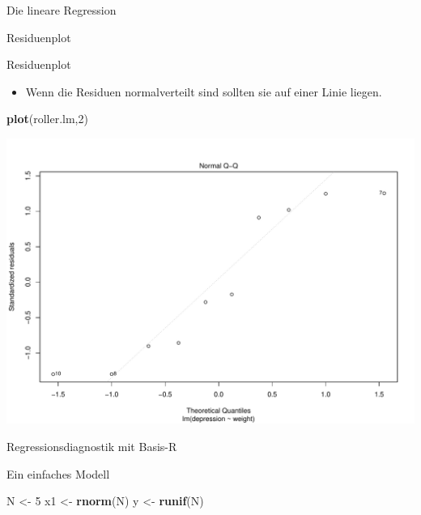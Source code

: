 \documentclass[ignorenonframetext,]{beamer}
\newenvironment{Shaded}{}{}
\newcommand{\KeywordTok}[1]{\textcolor[rgb]{0.00,0.44,0.13}{\textbf{{#1}}}}
\newcommand{\DecValTok}[1]{\textcolor[rgb]{0.25,0.63,0.44}{{#1}}}
\newcommand{\StringTok}[1]{\textcolor[rgb]{0.25,0.44,0.63}{{#1}}}
\newcommand{\NormalTok}[1]{{#1}}
\providecommand{\tightlist}{%
\setlength{\itemsep}{0pt}\setlength{\parskip}{0pt}}
\begin{document}
\begin{frame}[fragile]{Die lineare Regression}
\begin{block}{Residuenplot}
\end{block}

\begin{block}{Residuenplot}

\begin{itemize}
\tightlist
\item
  Wenn die Residuen normalverteilt sind sollten sie auf einer Linie
  liegen.
\end{itemize}

\begin{Shaded}
\begin{Highlighting}[]
\KeywordTok{plot}\NormalTok{(roller.lm,}\DecValTok{2}\NormalTok{)}
\end{Highlighting}
\end{Shaded}

\includegraphics{R_intern_files/figure-beamer/unnamed-chunk-296-1.pdf}

\end{block}

\begin{block}{Regressionsdiagnostik mit Basis-R}

Ein einfaches Modell

\begin{Shaded}
\begin{Highlighting}[]
\NormalTok{N <-}\StringTok{ }\DecValTok{5}
\NormalTok{x1 <-}\StringTok{ }\KeywordTok{rnorm}\NormalTok{(N)}
\NormalTok{y <-}\StringTok{ }\KeywordTok{runif}\NormalTok{(N)}
\end{Highlighting}
\end{Shaded}

\end{block}


\end{frame}
\end{document}

